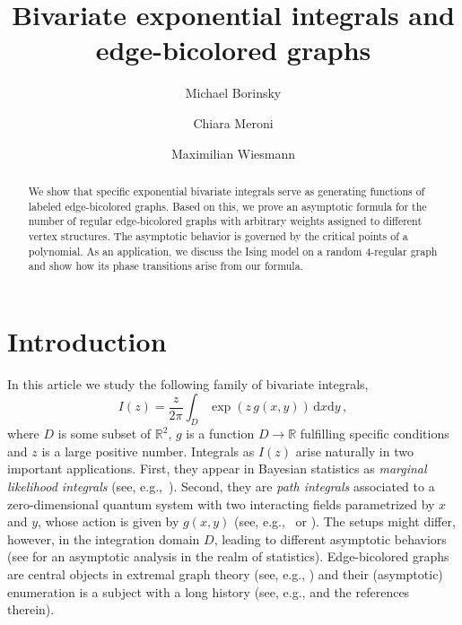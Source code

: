 \documentclass[english]{ourlematemasingle}
\title{Bivariate exponential integrals and edge-bicolored graphs}
\author{Michael Borinsky}
\author{Chiara Meroni}
\author{Maximilian Wiesmann}
\numberwithin{theorem}{section}
\theoremstyle{remark}
\newcommand{\R}{\mathbb{R}}
\newcommand{\dd}{\mathrm{d}}
\begin{document}
\begin{abstract}
We show that specific exponential bivariate integrals serve as generating functions of labeled edge-bicolored graphs.
Based on this, we prove an asymptotic formula for the number of regular edge-bicolored graphs with arbitrary weights assigned to different vertex structures. The asymptotic behavior is governed by the critical points of a polynomial.
As an application, we discuss the Ising model on a random 4-regular graph and show how its phase transitions arise from our formula.
\end{abstract}


\section{Introduction}
In this article we study the following family of bivariate integrals,
\begin{equation}
\label{equ:exponentialIntegral}
I(z) = \frac{z}{2\pi}
\int_D \exp\left( {z\, g(x,y)} \right) \, \dd x \dd y\,,
\end{equation}
where $D$ is some subset of $\R^2$, $g$ is a function $D\rightarrow \R$ fulfilling specific conditions and $z$ is a large positive number. Integrals as $I(z)$ arise naturally in two important applications. First, they appear in Bayesian statistics as \emph{marginal likelihood integrals} (see, e.g.,\ \cite[\S 1]{watanabe2009algebraic}). Second, they are \emph{path integrals} associated to a zero-dimensional quantum system with two interacting fields parametrized by $x$ and $y$, whose action is given by $g(x,y)$ (see, e.g.,~\cite[\S 2]{skinner2018quantum} or \cite{bessis1980quantum}). The setups might differ, however, in the integration domain $D$, leading to different asymptotic behaviors (see \cite{lin2011algebraic} for an asymptotic analysis in the realm of statistics).
Edge-bicolored graphs are central objects in extremal graph theory (see, e.g., \cite[Ch.~V]{bollobas2004extremal}) and their (asymptotic) enumeration is a subject with a long history  (see, e.g., \cite{MR3966531} and the references therein).\par 
\end{document}

